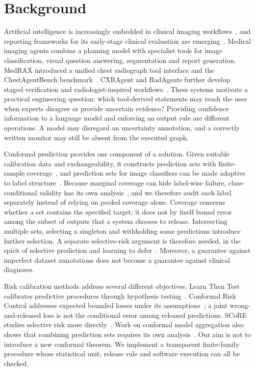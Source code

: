 \documentclass[10pt,a4paper]{article}
\begin{document}
\section{Background}
Artificial intelligence is increasingly embedded in clinical imaging workflows~\cite{topol2019high}, and reporting frameworks for its early-stage clinical evaluation are emerging~\cite{decideai}. Medical imaging agents combine a planning model with specialist tools for image classification, visual question answering, segmentation and report generation. MedRAX introduced a unified chest radiograph tool interface and the ChestAgentBench benchmark~\cite{medrax}. CXRAgent and RadAgents further develop staged verification and radiologist-inspired workflows~\cite{cxragent,radagents}. These systems motivate a practical engineering question: which tool-derived statements may reach the user when experts disagree or provide uncertain evidence? Providing confidence information to a language model and enforcing an output rule are different operations. A model may disregard an uncertainty annotation, and a correctly written monitor may still be absent from the executed graph.

Conformal prediction provides one component of a solution. Given suitable calibration data and exchangeability, it constructs prediction sets with finite-sample coverage~\cite{vovk,gentle}, and prediction sets for image classifiers can be made adaptive to label structure~\cite{angelopoulos2021uncertainty,romano2020classification}. Because marginal coverage can hide label-wise failure, class-conditional validity has its own analysis~\cite{vovk2012conditional}, and we therefore audit each label separately instead of relying on pooled coverage alone. Coverage concerns whether a set contains the specified target; it does not by itself bound error among the subset of outputs that a system chooses to release. Intersecting multiple sets, selecting a singleton and withholding some predictions introduce further selection. A separate selective-risk argument is therefore needed, in the spirit of selective prediction and learning to defer~\cite{hendrycks2017baseline,geifman2017selective,mozannar2020consistent,madras2018predict}. Moreover, a guarantee against imperfect dataset annotations does not become a guarantee against clinical diagnoses.

Risk calibration methods address several different objectives. Learn Then Test calibrates predictive procedures through hypothesis testing~\cite{ltt}. Conformal Risk Control addresses expected bounded losses under its assumptions~\cite{crc}; a joint wrong-and-released loss is not the conditional error among released predictions. SCoRE studies selective risk more directly~\cite{score}. Work on conformal model aggregation also shows that combining prediction sets requires its own analysis~\cite{coma}. Our aim is not to introduce a new conformal theorem. We implement a transparent finite-family procedure whose statistical unit, release rule and software execution can all be checked.
\end{document}
